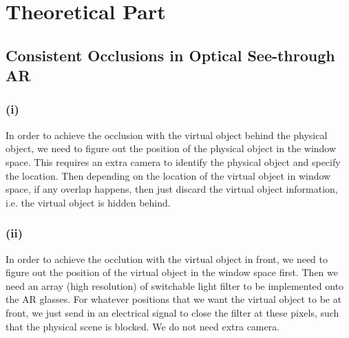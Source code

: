 \documentclass[11pt]{article}
\begin{document}
 


\section{Theoretical Part}
\subsection{Consistent Occlusions in Optical See-through AR}
\subsubsection*{(i)}
In order to achieve the occlusion with the virtual object behind the physical object, we need to figure out the position of the physical object in the window space. This requires an extra camera to identify the physical object and specify the location. Then depending on the location of the virtual object in window space, if any overlap happens, then just discard the virtual object information, i.e. the virtual object is hidden behind. 
\subsubsection*{(ii)}
In order to achieve the occlution with the virtual object in front, we need to figure out the position of the virtual object in the window space first. Then we need an array (high resolution) of switchable light filter to be implemented onto the AR glasses. For whatever positions that we want the virtual object to be at front, we just send in an electrical signal to close the filter at these pixels, such that the physical scene is blocked. We do not need extra camera. 
\end{document}
